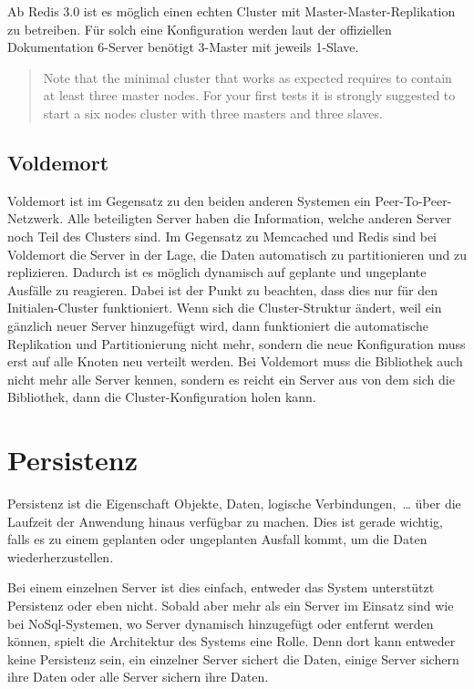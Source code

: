 Ab Redis 3.0 ist es möglich einen echten Cluster mit Master-Master-Replikation
zu betreiben. Für solch eine Konfiguration werden laut der offiziellen
Dokumentation 6-Server benötigt 3-Master mit jeweils 1-Slave.

\foreignblockquote{english}[\cite{Redis2010}]{Note that the minimal cluster
that works as expected requires to contain at least three master nodes. For your
first tests it is strongly suggested to start a six nodes cluster with three
masters and three slaves.}

\subsection{Voldemort}
Voldemort ist im Gegensatz zu den beiden anderen Systemen ein
Peer-To-Peer-Netzwerk. Alle beteiligten Server haben die Information, welche
anderen Server noch Teil des Clusters sind. Im Gegensatz zu Memcached und Redis
sind bei Voldemort die Server in der Lage, die Daten automatisch zu
partitionieren und zu replizieren. Dadurch ist es möglich dynamisch auf geplante
und ungeplante Ausfälle zu reagieren. Dabei ist der Punkt zu beachten, dass
dies nur für den Initialen-Cluster funktioniert. Wenn sich die Cluster-Struktur
ändert, weil ein gänzlich neuer Server hinzugefügt wird, dann funktioniert die
automatische Replikation und Partitionierung nicht mehr, sondern die neue
Konfiguration muss erst auf alle Knoten neu verteilt werden. Bei Voldemort muss
die Bibliothek auch nicht mehr alle Server kennen, sondern es reicht ein Server
aus von dem sich die Bibliothek, dann die Cluster-Konfiguration holen kann.

\section{Persistenz}
Persistenz ist die Eigenschaft Objekte, Daten, logische Verbindungen,~\dots{}
über die Laufzeit der Anwendung hinaus verfügbar zu machen. Dies ist gerade
wichtig, falls es zu einem geplanten oder ungeplanten Ausfall kommt, um die
Daten wiederherzustellen.

Bei einem einzelnen Server ist dies einfach, entweder das System unterstützt
Persistenz oder eben nicht. Sobald aber mehr als ein Server im Einsatz sind wie
bei NoSql-Systemen, wo Server dynamisch hinzugefügt oder entfernt werden können,
spielt die Architektur des Systems eine Rolle. Denn dort kann entweder keine
Persistenz sein, ein einzelner Server sichert die Daten, einige Server sichern
ihre Daten oder alle Server sichern ihre Daten.


